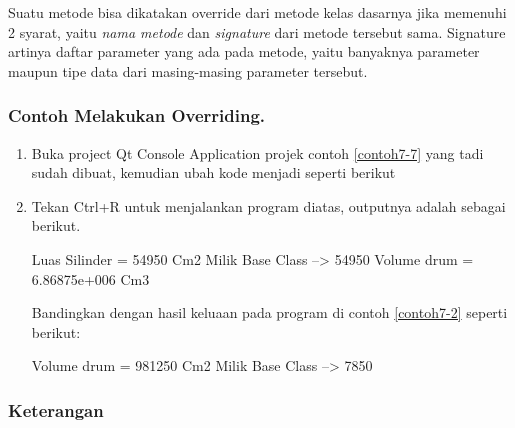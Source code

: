 Suatu metode bisa dikatakan override dari metode kelas dasarnya jika
memenuhi 2 syarat, yaitu \emph{nama metode} dan \emph{signature} dari
metode tersebut sama. Signature artinya daftar parameter yang ada pada
metode, yaitu banyaknya parameter maupun tipe data dari masing-masing
parameter tersebut.

\subsubsection*{Contoh Melakukan Overriding.}
\begin{enumerate}


	\item Buka project Qt Console Application projek contoh \ref{contoh7-7} yang tadi sudah
	dibuat, kemudian ubah kode menjadi seperti berikut



\item Tekan Ctrl+R untuk menjalankan program diatas, outputnya adalah
 sebagai berikut.


	\begin{lcverbatim}
Luas Silinder = 54950 Cm2
Milik Base Class --> 54950
Volume drum = 6.86875e+006 Cm3
	\end{lcverbatim}

	Bandingkan dengan hasil keluaan pada program di contoh \ref{contoh7-2}
 seperti berikut:

	\begin{lcverbatim}
Volume drum = 981250 Cm2
Milik Base Class --> 7850
	\end{lcverbatim}
\end{enumerate}


\subsubsection*{Keterangan}


